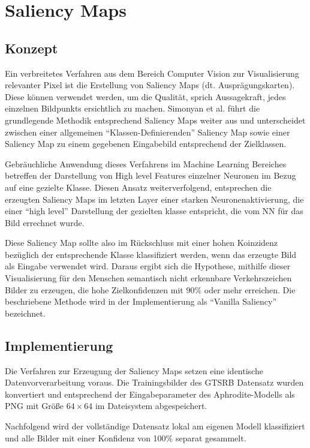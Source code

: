 \chapter{Saliency Maps}
\label{cha:saliency}

\section{Konzept}
Ein verbreitetes Verfahren aus dem Bereich Computer Vision zur Visualisierung relevanter Pixel ist die Erstellung von Saliency Maps (dt. Ausprägungskarten). Diese können verwendet werden, um die Qualität, sprich Aussagekraft, jedes einzelnen Bildpunkts ersichtlich zu machen. Simonyan et al. \cite{simonyan_deep_2013} führt die grundlegende Methodik entsprechend Saliency Maps weiter aus und unterscheidet zwischen einer allgemeinen "`Klassen-Definierenden"' Saliency Map sowie einer Saliency Map zu einem gegebenen Eingabebild entsprechend der Zielklassen.


Gebräuchliche Anwendung dieses Verfahrens im Machine Learning Bereiches betreffen der Darstellung von High level Features einzelner Neuronen \cite{liu_delving_2016} im Bezug auf eine gezielte Klasse. Diesen Ansatz weiterverfolgend, entsprechen die erzeugten Saliency Maps im letzten Layer einer starken Neuronenaktivierung, die einer "`high level"' Darstellung der gezielten klasse entspricht, die vom NN für das Bild errechnet wurde. 


Diese Saliency Map sollte also im Rückschluss mit einer hohen Koinzidenz bezüglich der entsprechende Klasse klassifiziert werden, wenn das erzeugte Bild als Eingabe verwendet wird. Daraus ergibt sich die Hypothese, mithilfe dieser Visualisierung für den Menschen semantisch nicht erkennbare Verkehrszeichen Bilder zu erzeugen, die hohe Zielkonfidenzen mit $90\%$ oder mehr erreichen. Die beschriebene Methode wird in der Implementierung als "`Vanilla Saliency"' bezeichnet.

\section{Implementierung}

Die Verfahren zur Erzeugung der Saliency Maps setzen eine identische Datenvorverarbeitung voraus. 
Die Trainingsbilder des GTSRB Datensatz wurden konvertiert und entsprechend der Eingabeparameter des Aphrodite-Modells als PNG mit Größe $64 \times 64 $ im Dateisystem abgespeichert.

Nachfolgend wird der vollständige Datensatz lokal am eigenen Modell klassifiziert und alle Bilder mit einer Konfidenz von 100\% separat gesammelt. 

